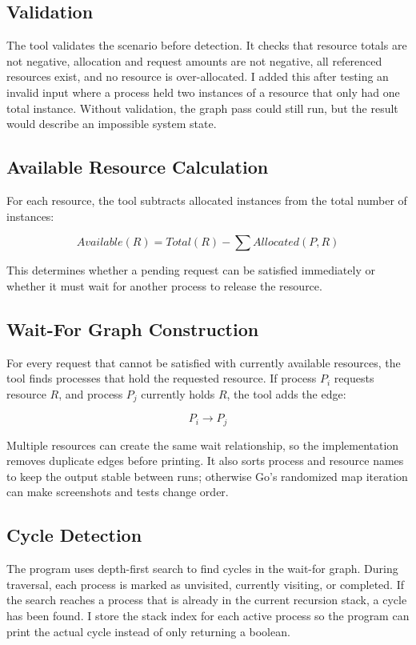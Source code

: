\documentclass[10pt]{article}
\begin{document}
\subsection{Validation}

The tool validates the scenario before detection. It checks that resource totals are not negative, allocation and request amounts are not negative, all referenced resources exist, and no resource is over-allocated. I added this after testing an invalid input where a process held two instances of a resource that only had one total instance. Without validation, the graph pass could still run, but the result would describe an impossible system state.

\subsection{Available Resource Calculation}

For each resource, the tool subtracts allocated instances from the total number of instances:

\[
Available(R) = Total(R) - \sum Allocated(P, R)
\]

This determines whether a pending request can be satisfied immediately or whether it must wait for another process to release the resource.

\subsection{Wait-For Graph Construction}

For every request that cannot be satisfied with currently available resources, the tool finds processes that hold the requested resource. If process \(P_i\) requests resource \(R\), and process \(P_j\) currently holds \(R\), the tool adds the edge:

\[
P_i \rightarrow P_j
\]

Multiple resources can create the same wait relationship, so the implementation removes duplicate edges before printing. It also sorts process and resource names to keep the output stable between runs; otherwise Go's randomized map iteration can make screenshots and tests change order.

\subsection{Cycle Detection}

The program uses depth-first search to find cycles in the wait-for graph. During traversal, each process is marked as unvisited, currently visiting, or completed. If the search reaches a process that is already in the current recursion stack, a cycle has been found. I store the stack index for each active process so the program can print the actual cycle instead of only returning a boolean.
\end{document}

